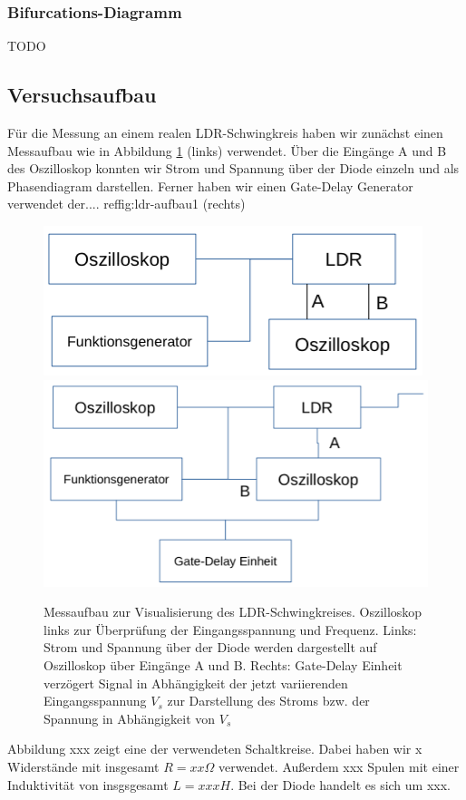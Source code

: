 \documentclass{scrartcl}
\begin{document}
\subsubsection{Bifurcations-Diagramm}
TODO


\subsection{ Versuchsaufbau}
Für die Messung an einem realen LDR-Schwingkreis haben wir zunächst einen Messaufbau wie in Abbildung \ref{fig:ldr-aufbau1} (links) verwendet. Über die Eingänge A und B des Oszilloskop konnten wir Strom und Spannung über der Diode einzeln und als Phasendiagram darstellen. Ferner haben wir einen Gate-Delay Generator verwendet der.... ref{fig:ldr-aufbau1} (rechts)
\begin{figure}
\includegraphics[scale=0.6]{aufbau1}
\includegraphics[scale=0.5]{aufbau2}
\caption{Messaufbau zur Visualisierung des LDR-Schwingkreises. Oszilloskop links zur Überprüfung der Eingangsspannung und Frequenz. Links: Strom und Spannung über der Diode werden dargestellt auf Oszilloskop über Eingänge A und B. Rechts: Gate-Delay Einheit verzögert Signal in Abhängigkeit der jetzt variierenden Eingangsspannung $V_s$ zur Darstellung des Stroms bzw. der Spannung in Abhängigkeit von $V_s$ }
\label{fig:ldr-aufbau1}
\end{figure}
Abbildung xxx zeigt eine der verwendeten Schaltkreise. Dabei haben wir x Widerstände mit insgesamt $R=xx\Omega$ verwendet. Außerdem xxx Spulen mit einer Induktivität von insgsgesamt $L=xxxH$. Bei der Diode handelt es sich um xxx. 
\end{document}
